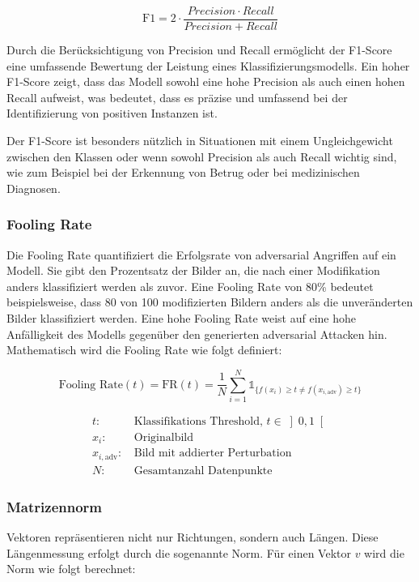 \begin{equation}
    \text{F1} = 2 \cdot \frac{Precision \cdot Recall}{Precision + Recall}
    \label{eq:F1Score}
\end{equation}

Durch die Berücksichtigung von Precision und Recall ermöglicht der F1-Score eine umfassende Bewertung der Leistung eines Klassifizierungsmodells. Ein hoher F1-Score zeigt, dass das Modell sowohl eine hohe Precision als auch einen hohen Recall aufweist, was bedeutet, dass es präzise und umfassend bei der Identifizierung von positiven Instanzen ist.

Der F1-Score ist besonders nützlich in Situationen mit einem Ungleichgewicht zwischen den Klassen oder wenn sowohl Precision als auch Recall wichtig sind, wie zum Beispiel bei der Erkennung von Betrug oder bei medizinischen Diagnosen.

\subsubsection{Fooling Rate} \label{chap:fooling rate}
Die Fooling Rate quantifiziert die Erfolgsrate von adversarial Angriffen auf ein Modell. Sie gibt den Prozentsatz der Bilder an, die nach einer Modifikation anders klassifiziert werden als zuvor. Eine Fooling Rate von 80\% bedeutet beispielsweise, dass 80 von 100 modifizierten Bildern anders als die unveränderten Bilder klassifiziert werden. Eine hohe Fooling Rate weist auf eine hohe Anfälligkeit des Modells gegenüber den generierten adversarial Attacken hin. Mathematisch wird die Fooling Rate wie folgt definiert:

\begin{equation}
    \text{Fooling Rate}(t) = \text{FR}(t) = \frac{1}{N} \sum_{i=1}^{N} \mathds{1}_{\{f(x_i) \geq t \neq f(x_{i,\text{adv}}) \geq t\}}
    \label{eq:Fooling Rate}
\end{equation}

\begin{align*}
t\text{:} &\text{ Klassifikations Threshold, } t \in \left] 0, 1 \right[ \\
x_i\text{:} &\text{ Originalbild} \\
x_{i,\text{adv}}\text{:} &\text{ Bild mit addierter Perturbation} \\
N\text{:} &\text{ Gesamtanzahl Datenpunkte}
\end{align*}

\subsubsection{Matrizennorm} \label{chap:matrizennorm}
Vektoren repräsentieren nicht nur Richtungen, sondern auch Längen. Diese Längenmessung erfolgt durch die sogenannte Norm. Für einen Vektor $v$ wird die Norm wie folgt berechnet:

